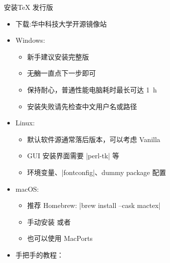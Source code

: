 \begin{frame}{安装\TeX{} 发行版}
  \begin{itemize}
    \item 下载:华中科技大学开源镜像站  \pause
    \item \faWindows{} Windows:
      \begin{itemize}
        \item 新手建议安装完整版 \TeXLive{}
        \item \sout{无脑}一直点下一步即可
        \item 保持耐心，普通性能电脑耗时最长可达 \qty{1}{h}
        \item 安装失败请先检查中文用户名或路径
      \end{itemize} \pause
    \item \faLinux{} Linux:
      \begin{itemize}
        \item 默认软件源通常落后版本，可以考虑 Vanilla \TeXLive{}
        \item GUI 安装界面需要 |perl-tk| 等
        \item 环境变量、|fontconfig|、dummy package 配置
      \end{itemize}
    \item \faApple{} macOS:
      \begin{itemize}
        \item 推荐 Homebrew: |brew install --cask mactex|
        \item 手动安装 \MacTeX{} 或者 \TeXLive{}
        \item 也可以使用 MacPorts
      \end{itemize}
    \item 手把手的教程：
  \end{itemize}
\end{frame}
